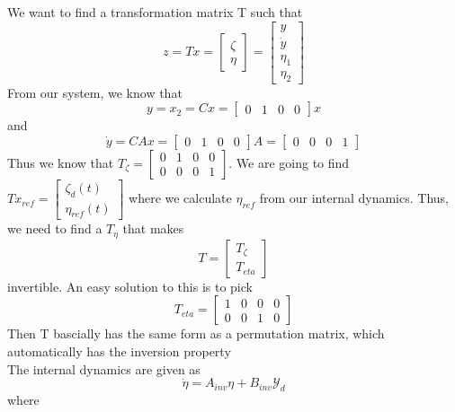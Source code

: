 \documentclass[12pt,a4paper, onecolumn]{exam}
\begin{document}
\begin{questions}
\begin{parts}
\begin{solution}
    We want to find a transformation matrix T such that 
    \[
        z = Tx = \begin{bmatrix}
            \zeta\\
            \eta
        \end{bmatrix} = \begin{bmatrix}
            y\\
            \dot{y}\\
            \eta_1\\
            \eta_2
        \end{bmatrix} 
    \]
    From our system, we know that $$ y=x_2 =Cx = \begin{bmatrix}
        0&1&0&0
    \end{bmatrix} x $$ and $$ \dot{y} = CAx = \begin{bmatrix}
        0&1&0&0
    \end{bmatrix} A = \begin{bmatrix}
        0&0&0&1
    \end{bmatrix}  $$  
    Thus we know that $ T_{\zeta} = \begin{bmatrix}
        0&1&0&0\\
        0&0&0&1
    \end{bmatrix}  $. We are going to find $ Tx_{ref} = \begin{bmatrix}
        \zeta_d(t)\\
        \eta_{ref}(t)
    \end{bmatrix}   $ where we calculate $ \eta_{ref} $ from our internal dynamics. Thus, we need to find a $ T_{\eta} $ that makes
    \[
        T = \begin{bmatrix}
            T_{\zeta}\\
            T_{eta}
        \end{bmatrix} 
    \] invertible. An easy solution to this is to pick
    \[
        T_{eta} = \begin{bmatrix}
            1&0&0&0\\
            0&0&1&0
        \end{bmatrix} 
    \]
    Then T bascially has the same form as a permutation matrix, which automatically has the inversion property\\


    The internal dynamics are given as 
    \[
        \dot{\eta} = A_{inv} \eta + B_{inv} \mathcal{Y}_d
    \]
    where


\end{solution}
\end{parts}
\end{questions}
\end{document}
